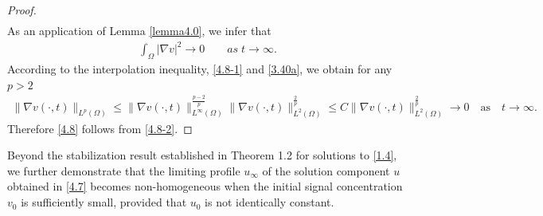\documentclass[12pt]{article}
\theoremstyle{plain}
\theoremstyle{definition}
\numberwithin{equation}{section}
\begin{document}
\begin{proof}
\begin{align}
\end{align}
As an application of Lemma \ref{lemma4.0}, we infer that
\begin{align}\label{4.8-1}
    \int_{\Omega}|\nabla v|^2\rightarrow 0\qquad as\; t\to \infty.
\end{align}
According to the interpolation inequality, \eqref{4.8-1} and \eqref{3.40a}, we obtain  for any $p>2$
\begin{align}\label{4.8-2}
    \|\nabla v(\cdot,t)\|_{L^{p}(\Omega)}\leq \|\nabla v(\cdot,t)\|_{L^{\infty}(\Omega)}^{\frac{p-2}{p}}\|\nabla v(\cdot,t)\|_{L^{2}(\Omega)}^{\frac{2}{p}}\leq C\|\nabla v(\cdot,t)\|_{L^{2}(\Omega)}^{\frac{2}{p}}\rightarrow 0 \quad \text{as} \quad t \to \infty.
\end{align}
Therefore \eqref{4.8} follows from \eqref{4.8-2}.
\end{proof}

  Beyond the stabilization  result established in Theorem 1.2 for solutions to
   \eqref{1.4}, we further demonstrate that  the  limiting  profile $u_{\infty}$ of the solution component $u$  obtained in \eqref{4.7} becomes non-homogeneous  when the initial signal concentration $v_0$ is sufficiently small, provided that $u_0$ is not identically constant.
\end{document}
